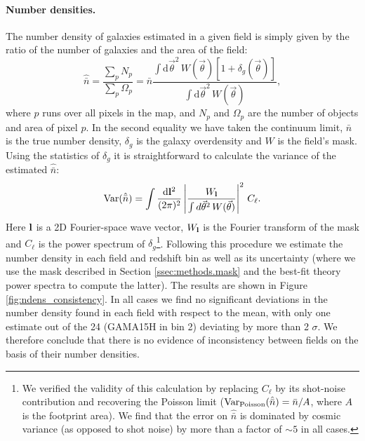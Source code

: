 \documentclass[a4paper,11pt]{article}
\newcommand{\nv}{\vec{\theta}}
\begin{document}
      \paragraph{Number densities.} The number density of galaxies estimated in a given field is simply given by the ratio of the number of galaxies and the area of the field:
      \begin{equation}
        \hat{\bar{n}}=\frac{\sum_p N_p}{\sum_p \Omega_p}= \bar{n} \frac{\int \mathrm{d}\nv^2\,W(\nv)\left[1+\delta_g(\nv)\right]}{\int \mathrm{d}\nv^2\,W(\nv)},
      \end{equation}
      where $p$ runs over all pixels in the map, and $N_p$ and $\Omega_p$ are the number of objects and area of pixel $p$. In the second equality we have taken the continuum limit, $\bar{n}$ is the true number density, $\delta_g$ is the galaxy overdensity and $W$ is the field's mask. Using the statistics of $\delta_g$ it is straightforward to calculate the variance of the estimated $\hat{\bar n}$:
      \begin{equation}
       {\rm Var}(\hat{\bar n})=\int \frac{\mathrm{d}{\bf l}^2}{(2\pi)^2}\left|\frac{W_{\bf l}}{\int d\nv^2\,W(\nv)}\right|^2\,C_\ell.
      \end{equation}
      Here ${\bf l}$ is a 2D Fourier-space wave vector, $W_{\bf l}$ is the Fourier transform of the mask and $C_\ell$ is the power spectrum of $\delta_g$\footnote{We verified the validity of this calculation by replacing $C_\ell$ by its shot-noise contribution and recovering the Poisson limit (${\rm Var}_{\rm Poisson}(\hat{\bar n})=\bar{n}/A$, where $A$ is the footprint area). We find that the error on $\hat{\bar n}$ is dominated by cosmic variance (as opposed to shot noise) by more than a factor of $\sim5$ in all cases.}. Following this procedure we estimate the number density in each field and redshift bin as well as its uncertainty (where we use the mask described in Section \ref{ssec:methods.mask} and the best-fit theory power spectra to compute the latter). The results are shown in Figure \ref{fig:ndens_consistency}. In all cases we find no significant deviations in the number density found in each field with respect to the mean, with only one estimate out of the 24 (GAMA15H in bin 2) deviating by more than 2 $\sigma$. We therefore conclude that there is no evidence of inconsistency between fields on the basis of their number densities.
\end{document}
